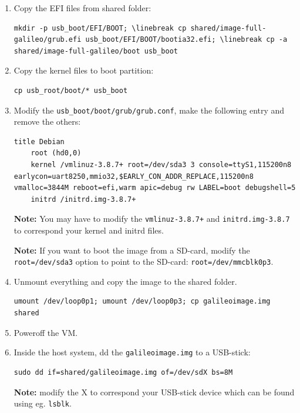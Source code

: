 \documentclass[a4paper,11pt]{article}
\newcommand{\note}{\textbf{Note: }}
\newcommand{\cmd}[1]{\texttt{#1}}
\begin{document}
\begin{enumerate}
\item Copy the EFI files from shared folder: 
\begin{lstlisting}
mkdir -p usb_boot/EFI/BOOT; \linebreak cp shared/image-full-galileo/grub.efi usb_boot/EFI/BOOT/bootia32.efi; \linebreak cp -a shared/image-full-galileo/boot usb_boot
\end{lstlisting}

\item Copy the kernel files to boot partition: 
\begin{lstlisting}
cp usb_root/boot/* usb_boot
\end{lstlisting}

\item Modify the \cmd{usb\_boot/boot/grub/grub.conf}, make the following entry and remove the others:
\begin{lstlisting}
title Debian
    root (hd0,0)
    kernel /vmlinuz-3.8.7+ root=/dev/sda3 3 console=ttyS1,115200n8 earlycon=uart8250,mmio32,$EARLY_CON_ADDR_REPLACE,115200n8 vmalloc=3844M reboot=efi,warm apic=debug rw LABEL=boot debugshell=5
    initrd /initrd.img-3.8.7+
\end{lstlisting}
\note You may have to modify the \cmd{vmlinuz-3.8.7+} and \cmd{initrd.img-3.8.7} to correspond your kernel and initrd files.

\note If you want to boot the image from a SD-card, modify the \cmd{root=/dev/sda3} option to point to the SD-card: \cmd{root=/dev/mmcblk0p3}.

\item Unmount everything and copy the image to the shared folder. 
\begin{lstlisting}
umount /dev/loop0p1; umount /dev/loop0p3; cp galileoimage.img shared
\end{lstlisting}

\item Poweroff the VM.

\item Inside the host system, dd the \cmd{galileoimage.img} to a USB-stick: 
\begin{lstlisting}
sudo dd if=shared/galileoimage.img of=/dev/sdX bs=8M
\end{lstlisting}

\note modify the X to correspond your USB-stick device which can be found using eg. \cmd{lsblk}.
\end{enumerate}

\pagebreak
\end{document}
